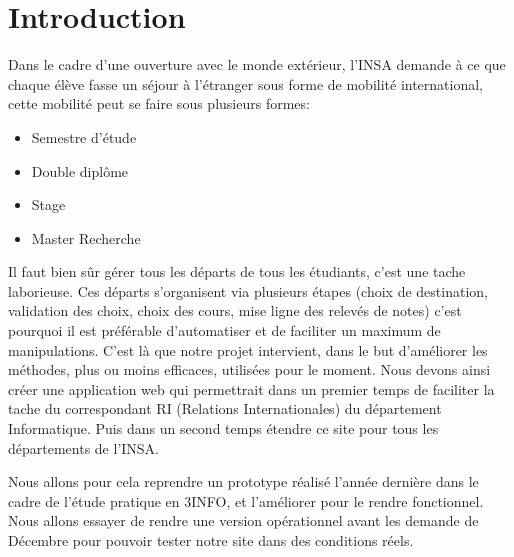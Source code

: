\chapter*{Introduction}
Dans le cadre d'une ouverture avec le monde extérieur, l'INSA demande à ce que chaque élève fasse un séjour à l’étranger sous forme de mobilité international, cette mobilité peut se faire sous plusieurs formes:
\begin{itemize}
\item Semestre d'étude
\item Double diplôme
\item Stage
\item Master Recherche
\end{itemize}

Il faut bien sûr gérer tous les départs de tous les étudiants, c'est une tache laborieuse.
Ces départs s'organisent via plusieurs étapes (choix de destination, validation des choix, choix des cours, mise ligne des relevés de notes) c'est pourquoi il est préférable d'automatiser et de faciliter un maximum de manipulations.
C'est là que notre projet intervient, dans le but d'améliorer les méthodes, plus ou moins efficaces, utilisées pour le moment. Nous devons ainsi créer une application web qui permettrait dans un premier temps de faciliter la tache du correspondant RI (Relations Internationales) du département Informatique. Puis dans un second temps étendre ce site pour tous les départements de l'INSA.

Nous allons pour cela reprendre un prototype réalisé l'année dernière dans le cadre de l'étude pratique en 3INFO, et l'améliorer pour le rendre fonctionnel.
Nous allons essayer de rendre une version opérationnel avant les demande de Décembre pour pouvoir tester notre site dans des conditions réels.

